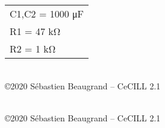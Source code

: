 \documentclass{kicad}
\begin{document}
\begin{center}
~\\
~\\
\\
~\\
~\\
\begin{tabular}{l}
C1,C2 = 1000 \si{\micro\farad}\\
R1 = 47 \si{\kilo\ohm}\\
R2 = 1 \si{\kilo\ohm}\\
\end{tabular}
\\
\vfill
\scriptsize
\copyright 2020 Sébastien Beaugrand -- CeCILL 2.1
\end{center}
\newpage
\vspace*{8cm}
\begin{center}
\\
\vfill
\scriptsize
\copyright 2020 Sébastien Beaugrand -- CeCILL 2.1
\end{center}
\end{document}
